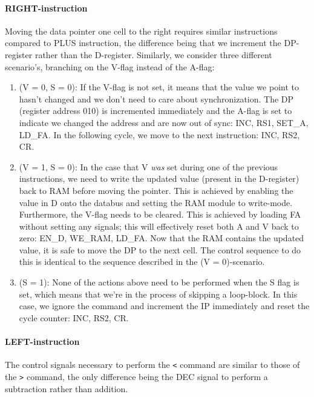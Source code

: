 \paragraph{RIGHT-instruction} Moving the data pointer one cell to the right requires similar instructions compared to PLUS instruction, the difference being that we increment the DP-register rather than the D-register. Similarly, we consider three different scenario's, branching on the V-flag instead of the A-flag:
%
\begin{enumerate}
\item (V = 0, S = 0): If the V-flag is not set, it means that the value we point to hasn't changed and we don't need to care about synchronization. The DP (register address 010) is incremented immediately and the A-flag is set to indicate we changed the address and are now out of sync: INC, RS1, SET\_A, LD\_FA. In the following cycle, we move to the next instruction: INC, RS2, CR.
\item (V = 1, S = 0): In the case that V \emph{was} set during one of the previous instructions, we need to write the updated value (present in the D-register) back to RAM before moving the pointer. This is achieved by enabling the value in D onto the databus and setting the RAM module to write-mode. Furthermore, the V-flag needs to be cleared. This is achieved by loading FA without setting any signals; this will effectively reset both A and V back to zero: EN\_D, WE\_RAM, LD\_FA. Now that the RAM contains the updated value, it is safe to move the DP to the next cell. The control sequence to do this is identical to the sequence described in the (V = 0)-scenario.
\item (S = 1): None of the actions above need to be performed when the S flag is set, which means that we're in the process of skipping a loop-block. In this case, we ignore the command and increment the IP immediately and reset the cycle counter: INC, RS2, CR.
\end{enumerate}

\paragraph{LEFT-instruction} The control signals necessary to perform the \texttt{<} command are similar to those of the \texttt{>} command, the only difference being the DEC signal to perform a subtraction rather than addition.


